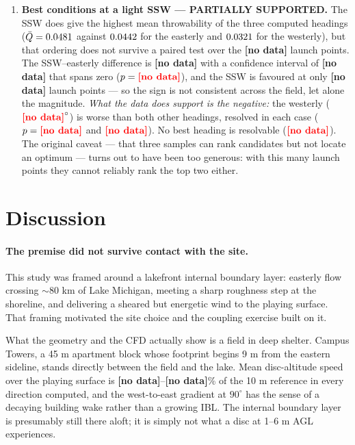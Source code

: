 \documentclass[11pt,letterpaper]{article}
\newcommand{\MISSINGNUM}{\textbf{\color{red}[no data]}}%
\newcommand{\UfieldFracMin}{\MISSINGNUM}\newcommand{\UfieldFracMax}{\MISSINGNUM}%
\newcommand{\QsigNlaunch}{\MISSINGNUM}\newcommand{\QsigNboot}{\MISSINGNUM}%
\newcommand{\QdiffNineZerovsTwoOneZero}{\MISSINGNUM}%
\newcommand{\QciNineZerovsTwoOneZero}{\MISSINGNUM}%
\newcommand{\QptNineZerovsTwoOneZero}{\MISSINGNUM}%
\newcommand{\QfavourNineZerovsTwoOneZero}{\MISSINGNUM}%
\newcommand{\QptNineZerovsTwoSevenZero}{\MISSINGNUM}%
\newcommand{\QptTwoOneZerovsTwoSevenZero}{\MISSINGNUM}%
\newcommand{\QworstSupported}{\MISSINGNUM}\newcommand{\QbestSupported}{\MISSINGNUM}%
\begin{document}
\begin{enumerate}[leftmargin=*,itemsep=4pt]
  \item \textbf{Best conditions at a light SSW --- PARTIALLY SUPPORTED.} The SSW does
    give the highest mean throwability of the three computed headings
    ($\bar Q = 0.0481$ against $0.0442$ for the easterly and
    $0.0321$ for the westerly), but that ordering does not survive
    a paired test over the \QsigNlaunch{} launch points. The SSW--easterly
    difference is \QdiffNineZerovsTwoOneZero{} with a confidence interval of
    \QciNineZerovsTwoOneZero{} that spans zero
    ($p = \QptNineZerovsTwoOneZero$), and the SSW is favoured at only
    \QfavourNineZerovsTwoOneZero{} launch points --- so the sign is not
    consistent across the field, let alone the magnitude.
    \emph{What the data does support is the negative:} the westerly
    ($\QworstSupported^\circ$) is worse than both other headings, resolved in
    each case ($p = \QptNineZerovsTwoSevenZero$ and
    $\QptTwoOneZerovsTwoSevenZero$). No best heading is resolvable
    ($\QbestSupported$). The original caveat --- that three samples can rank
    candidates but not locate an optimum --- turns out to have been too
    generous: with this many launch points they cannot reliably rank the top
    two either.
\end{enumerate}

\section{Discussion}
\label{sec:discussion}

\paragraph{The premise did not survive contact with the site.} This study was
framed around a lakefront internal boundary layer: easterly flow crossing
$\sim$80 km of Lake Michigan, meeting a sharp roughness step at the shoreline,
and delivering a sheared but energetic wind to the playing surface. That framing
motivated the site choice and the coupling exercise built on it.

What the geometry and the CFD actually show is a field in deep shelter. Campus
Towers, a 45 m apartment block whose footprint begins 9 m from the eastern
sideline, stands directly between the field and the lake. Mean disc-altitude
speed over the playing surface is \UfieldFracMin--\UfieldFracMax\% of the 10 m
reference in every direction computed, and the west-to-east gradient at $90^\circ$ has the sense of
a decaying building wake rather than a growing IBL. The internal boundary layer
is presumably still there aloft; it is simply not what a disc at 1--6 m AGL
experiences.
\end{document}
